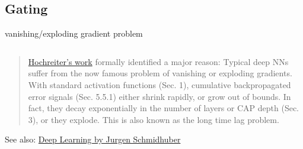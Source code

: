 \documentclass[aspectratio=169,xcolor={dvipsnames,svgnames}]{beamer}
\begin{document}
\subsection{Gating}
\label{sec:orgdd39034}
\begin{frame}[label={sec:vanishing-exploding-gradient-problem}]{vanishing/exploding gradient problem}
\begin{columns}
\begin{column}{0.7\columnwidth}
\begin{quote}
\href{https://doi.org/10.1109/9780470544037.ch14}{Hochreiter's work} formally identified a major reason:
Typical deep NNs suffer from the now famous problem of
vanishing or exploding gradients. With standard
activation functions (Sec. 1), cumulative
backpropagated error signals (Sec. 5.5.1) either shrink
rapidly, or grow out of bounds. In fact, they decay
\alert{exponentially} in the number of layers or CAP depth
(Sec. 3), or they explode. This is also known as the
long time lag problem.
\end{quote}
\alert{See also:} \href{https://arxiv.org/abs/1404.7828}{Deep Learning by Jurgen Schmidhuber}
\end{column}
\end{columns}
\end{frame}
\end{document}
